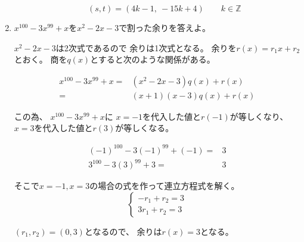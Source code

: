 \documentclass[12pt,b5paper]{ltjsarticle}
\begin{document}
\begin{enumerate}
\begin{enumerate}
            \begin{equation}
             (s,t)=(4k-1,\ -15k+4) \qquad k\in\mathbb{Z}
            \end{equation}
            



            \hrulefill
      \end{enumerate}
 \item
      $x^{100}-3x^{99}+x$を$x^2-2x-3$で割った余りを答えよ。

      \dotfill

      $x^2-2x-3$は2次式であるので
      余りは1次式となる。
      余りを$r(x)=r_1x+r_2$とおく。
      商を$q(x)$とすると次のような関係がある。

      \begin{align}
       x^{100}-3x^{99}+x
       =& (x^2-2x-3)q(x)+r(x)\\
       =& (x+1)(x-3)q(x)+r(x)
      \end{align}

      この為、
      $x^{100}-3x^{99}+x$に
      $x=-1$を代入した値と$r(-1)$が等しくなり、
      $x=3$を代入した値と$r(3)$が等しくなる。

      \begin{align}
       (-1)^{100}-3(-1)^{99}+(-1) =& 3\\
       3^{100}-3(3)^{99}+3 =& 3
      \end{align}

      そこで$x=-1,x=3$の場合の式を作って連立方程式を解く。
      \begin{equation}
       \begin{cases}
        -r_1+r_2 = 3\\
        3r_1+r_2 = 3
       \end{cases}
      \end{equation}

      $(r_1,r_2)=(0,3)$となるので、
      余りは$r(x)=3$となる。


      
      \hrulefill

\end{enumerate}
\end{document}
